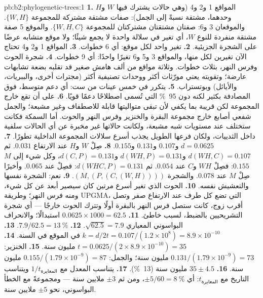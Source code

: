 \begin{solution}{pb:b2:phylogenetic-trees:1}
\textbf{1.} المواقع 1 و2 و4 (وهي حالات يشترك فيها $W$ و$H$ وحدهما،
مشتقة نسبةً إلى الجمل): صفات مشتقة مشتركة للمجموعة $\{W,H\}$. والموقعان 3
و6: صفتان مشتقتان مشتركتان للمجموعة $\{W,H,C\}$. والموقع 5 صفة مشتقة منفردة
للنوع $W$، أي تغير في سلالة واحدة لا يجمع شيئًا؛ ولا موقع
متشابه عرضًا على الشجرة الجزيئية.
\textbf{2.} تغير واحد لكل موقع: أي 6 خطوات.
\textbf{3.} المواقع 1 و2 و4 تحتاج الآن تغيرين لكل منها، والمواقع 3 و5
و6 تغيرًا واحدًا: أي 9 خطوات.
\textbf{4.} شجرة الحوت وفرس النهر، بثلاث خطوات. وثلاثة مواقع من
ألف هامش صغير قد تقلبه بضعة تشابهات عارضة؛
وتقويته يعني مورّثات أكثر ووحدات تصنيفية أكثر (مجترات
أخرى، والببريات، والأيائل) وبوتستراب.
\textbf{5.} يتكرر  في خمس عينات من ست: أي دعم
متوسط، فوق المصادفة بكثير لكنه دون \qty{95}{\%}
التي تُسمى اصطلاحًا دعمًا قويًا.
\textbf{6.} على  أن تقع خارج المجموعة لكن قريبة بما يكفي
لأن تبقى متواليتها قابلة للاصطفاف وغير مشبعة؛ والجمل
شفعي أصابع خارج مجموعة البقرة والخنزير وفرس النهر والحوت. أما
السمكة فكانت ستختلف عند مستويات شبه مشبعة، ولكانت حالاتها
غير مخبرة عن أي الحالات سلفية داخل الثدييات،
ولكان فرعها الطويل يجذب أسرع سلالات المجموعة الداخلية
تطورًا.
\textbf{7.} $d = 0.0625$ و$0.107$ و$0.131$ و$0.155$.
\textbf{8.} صِلْ $W$ و$H$ عند الارتفاع $0.031$. ثم $d(WH,C) =
0.107$ و$d(WH,P) = 0.131$ و$d(C,P) = 0.131$، وكل شيء إلى $M$
$0.155$: فصِلْ $WH$ و$C$ عند $0.054$. ثم $d(WHC,P) = 0.131$: فصِلْ
عند $0.065$. وأخيرًا صِلْ $M$ عند $0.078$. والشجرة $(M,(P,(C,(W,H))))$.
\textbf{9.} نعم: الشجرة نفسها والتعشيش نفسه.
\textbf{10.} الحوت الذي تغير أسرع مرتين كان سيصير
أبعد عن كل شيء، ومنه فرس النهر؛ وطريقة UPGMA، التي تضع كل
طرف عند الارتفاع صفر وتصل أقرب زوج، كانت ستصل فرس النهر
بالبقرة أولًا وتترك الحوت خارجًا --- أي شجرة
التشريحيين بالضبط، لسبب خاطئ.
\textbf{11.} $0.0625\times 1000 = 62.5$ استبدالًا؛ والانحراف البواسوني
المعياري $\sqrt{62.5} = 7.9$.
\textbf{12.} $7.9/62.5 = \qty{13}{\%}$.
\textbf{13.} $k = d/2t = 0.107/(1.2\times 10^{8}) = 8.9\times 10^{-10}$
في الموقع في السنة.
\textbf{14.} $t = 0.0625/(2\times 8.9\times 10^{-10}) = 35$ مليون
سنة.
\textbf{15.} الخنزير: $0.131/(1.79\times 10^{-9}) = 73$ مليون سنة؛
والجمل: $0.155/(1.79\times 10^{-9}) = 87$ مليون سنة.
\textbf{16.} $35 \pm 4.5$ مليون سنة (\qty{13}{\%}).
\textbf{17.} يتناسب المعدل مع $1/t_{\text{المعايرة}}$ ويتناسب التاريخ مع
$t_{\text{المعايرة}}$: أي $\pm 5/60 = \qty{8}{\%}$، ومن ثم $\pm 3$ ملايين سنة
--- ومجموعةً مع الخطأ البواسوني، نحو $\pm 5$ ملايين سنة.

\end{solution}
